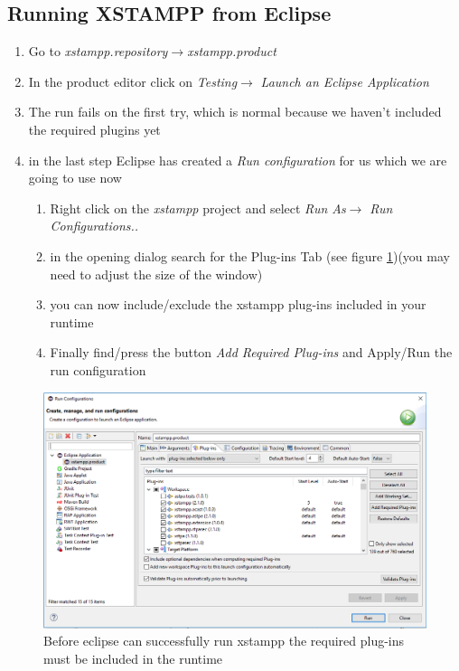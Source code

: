 \subsection{Running XSTAMPP from Eclipse}
\begin{enumerate}
\item Go to \textit{xstampp.repository}$\rightarrow$\textit{xstampp.product}
\item In the product editor click on  \textit{Testing}$\rightarrow$ \textit{Launch an Eclipse Application}
\item The run fails on the first try, which is normal because we haven't included the required plugins yet
\item in the last step Eclipse has created a \textit{Run configuration} for us which we are going to use now
	\begin{enumerate}
	\item Right click on the \textit{xstampp} project and select \textit{Run As}$\rightarrow$ \textit{Run Configurations..}
	\item in the opening dialog search for the Plug-ins Tab (see figure \ref{fig:runConfig})(you may need to adjust the size of the window)
	\item you can now include/exclude the xstampp plug-ins included in your runtime
	\item Finally find/press the button \textit{Add Required Plug-ins} and Apply/Run the run configuration
	\end{enumerate}
\end{enumerate}
\begin{figure}[H]
\includegraphics[scale=0.5]{images/runConfig.png}
\caption{Before eclipse can successfully run xstampp the required plug-ins must be included in the runtime}
\label{fig:runConfig}
\end{figure}

